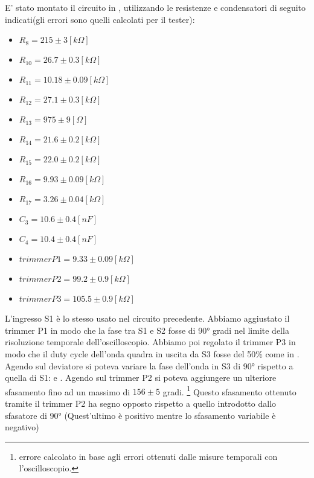 E' stato montato il circuito in , utilizzando le resistenze e condensatori di seguito indicati(gli errori sono quelli calcolati per il tester):
\begin{itemize}
\item $R_8=215 \pm 3[k\Omega]$
\item $R_{10}=26.7 \pm 0.3[k\Omega]$
\item $R_{11}=10.18 \pm 0.09[k\Omega]$
\item $R_{12}=27.1 \pm 0.3[k\Omega]$
\item $R_{13}=975 \pm 9[\Omega]$
\item $R_{14}=21.6 \pm 0.2[k\Omega]$
\item $R_{15}=22.0 \pm 0.2[k\Omega]$
\item $R_{16}=9.93 \pm 0.09[k\Omega]$
\item $R_{17}=3.26 \pm 0.04[k\Omega]$
\item $C_3=10.6 \pm 0.4[nF]$
\item $C_4=10.4 \pm 0.4[nF]$
\item $trimmer P1 = 9.33 \pm  0.09[k\Omega]$
\item $trimmer P2 = 99.2 \pm  0.9[k\Omega]$
\item $trimmer P3 = 105.5 \pm  0.9[k\Omega]$
\end{itemize} 
L'ingresso S1 è lo stesso usato nel circuito precedente.
Abbiamo aggiustato il trimmer P1 in modo che la fase tra S1 e S2 fosse di \ang{90} gradi nel limite della risoluzione temporale dell'oscilloscopio.
Abbiamo poi regolato il trimmer P3 in modo che il duty cycle dell'onda quadra in uscita da S3 fosse del 50\% come in .
Agendo sul deviatore si poteva variare la fase dell'onda in S3 di \ang{90} rispetto a quella di S1:   e .
Agendo sul trimmer P2 si poteva aggiungere un ulteriore sfasamento fino ad un massimo di $156 \pm 5$ gradi. \footnote{errore calcolato in base agli errori ottenuti dalle misure temporali con l'oscilloscopio.} Questo sfasamento ottenuto tramite il trimmer P2 ha segno opposto rispetto a quello introdotto dallo sfasatore di \ang{90} (Quest'ultimo è positivo mentre lo sfasamento variabile è negativo)

